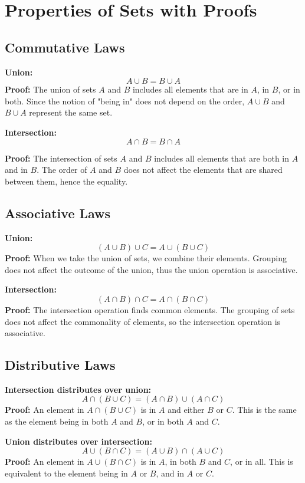 \documentclass[
	12pt, %
	fleqn, %
	a4paper, %
]{LegrandOrangeBook}
\begin{document}
\section*{Properties of Sets with Proofs}

\subsection*{Commutative Laws}
\textbf{Union:}
\[
A \cup B = B \cup A
\]
\textbf{Proof:} 
The union of sets \( A \) and \( B \) includes all elements that are in \( A \), in \( B \), or in both. Since the notion of "being in" does not depend on the order, \( A \cup B \) and \( B \cup A \) represent the same set.

\noindent\textbf{Intersection:}
$$A \cap B = B \cap A$$


\textbf{Proof:} 
The intersection of sets \( A \) and \( B \) includes all elements that are both in \( A \) and in \( B \). The order of \( A \) and \( B \) does not affect the elements that are shared between them, hence the equality.

\subsection*{Associative Laws}
\textbf{Union:}
\[
(A \cup B) \cup C = A \cup (B \cup C)
\]
\textbf{Proof:} 
When we take the union of sets, we combine their elements. Grouping does not affect the outcome of the union, thus the union operation is associative.

\textbf{Intersection:}
\[
(A \cap B) \cap C = A \cap (B \cap C)
\]
\textbf{Proof:} 
The intersection operation finds common elements. The grouping of sets does not affect the commonality of elements, so the intersection operation is associative.

\subsection*{Distributive Laws}
\textbf{Intersection distributes over union:}
\[
A \cap (B \cup C) = (A \cap B) \cup (A \cap C)
\]
\textbf{Proof:} 
An element in \( A \cap (B \cup C) \) is in \( A \) and either \( B \) or \( C \). This is the same as the element being in both \( A \) and \( B \), or in both \( A \) and \( C \).

\textbf{Union distributes over intersection:}
\[
A \cup (B \cap C) = (A \cup B) \cap (A \cup C)
\]
\textbf{Proof:} 
An element in \( A \cup (B \cap C) \) is in \( A \), in both \( B \) and \( C \), or in all. This is equivalent to the element being in \( A \) or \( B \), and in \( A \) or \( C \).
\end{document}
